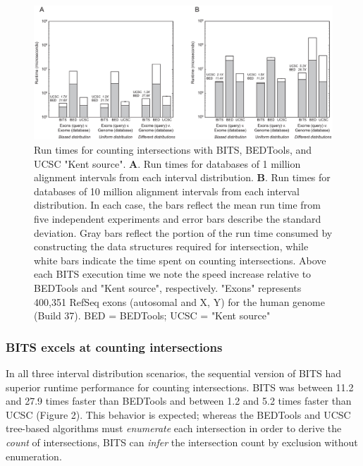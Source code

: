 \documentclass{bioinfo}
\begin{document}
        \begin{figure}[!h]
                \centering
                \includegraphics[width=7in]{figures/seq-counting.eps}
                \caption[]{Run times for counting intersections with 
                           BITS, BEDTools, and UCSC "Kent source".
                           \textbf{A}. Run times for databases of
                           1 million alignment intervals from each 
                           interval distribution.
                           \textbf{B}. Run times for databases of
                           10 million alignment intervals from each
                           interval distribution.
                           In each case, the bars reflect the mean
                           run time from five independent experiments
                           and error bars describe the standard deviation.
                           Gray bars reflect the portion of the run time
                           consumed by constructing the data structures
                           required for intersection, while white bars
                           indicate the time spent on counting intersections.
                           Above each BITS execution time we note the speed
                           increase relative to BEDTools and "Kent source",
                           respectively. "Exons" represents 400,351 RefSeq exons 
                           (autosomal and X, Y) for the human genome (Build 37).
                           BED = BEDTools; UCSC = "Kent source"}
        \end{figure}
        
        \subsubsection{BITS excels at counting intersections}
        
        In all three interval distribution scenarios, the sequential version 
        of BITS had superior runtime performance for counting intersections.
        BITS was between 11.2 and 27.9 times faster than BEDTools and between 
        1.2 and 5.2 times faster than UCSC (Figure 2). This behavior is 
        expected; whereas the BEDTools and UCSC tree-based algorithms must 
        \emph{enumerate} each intersection in order to derive the \emph{count} 
        of intersections, BITS can \emph{infer} the intersection count by 
        exclusion without enumeration.
\end{document}
